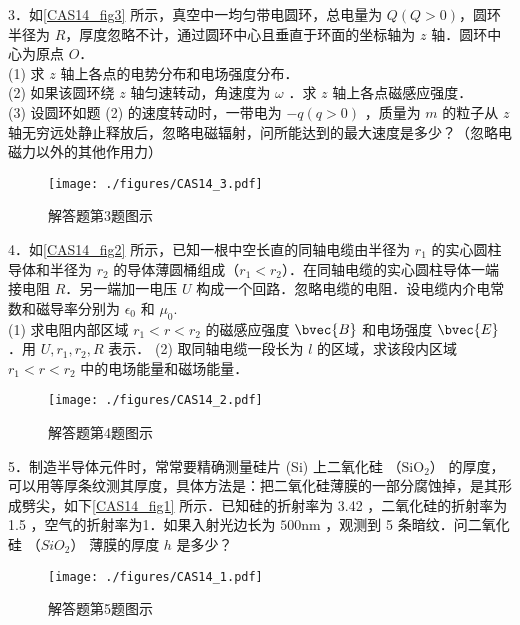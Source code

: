 3．如\autoref{CAS14_fig3} 所示，真空中一均匀带电圆环，总电量为 $Q(Q>0)$，圆环半径为 $R$，厚度忽略不计，通过圆环中心且垂直于环面的坐标轴为 $z$ 轴．圆环中心为原点 $O$．\\
(1) 求 $z$ 轴上各点的电势分布和电场强度分布．\\
(2) 如果该圆环绕 $z$ 轴匀速转动，角速度为 $\omega$ ．求 $z$ 轴上各点磁感应强度．\\
(3) 设圆环如题 (2) 的速度转动时，一带电为 $-q(q>0)$ ，质量为 $m$ 的粒子从 $z$ 轴无穷远处静止释放后，忽略电磁辐射，问所能达到的最大速度是多少？（忽略电磁力以外的其他作用力）
\begin{figure}[ht]
\centering
\texttt{[image: ./figures/CAS14\_3.pdf]}
\caption{解答题第3题图示} \label{CAS14_fig3}
\end{figure}

4．如\autoref{CAS14_fig2} 所示，已知一根中空长直的同轴电缆由半径为 $r_1$ 的实心圆柱导体和半径为 $r_2$ 的导体薄圆桶组成（$r_1<r_2$）．在同轴电缆的实心圆柱导体一端接电阻 $R$．另一端加一电压 $U$ 构成一个回路．忽略电缆的电阻．设电缆内介电常数和磁导率分别为 $\epsilon_0$ 和 $\mu_0$.\\
(1) 求电阻内部区域 $r_1<r<r_2$ 的磁感应强度 $\bvec{B}$ 和电场强度 $\bvec{E}$．用 $U,r_1,r_2,R$ 表示．
(2) 取同轴电缆一段长为 $l$ 的区域，求该段内区域 $r_1<r<r_2$ 中的电场能量和磁场能量．
\begin{figure}[ht]
\centering
\texttt{[image: ./figures/CAS14\_2.pdf]}
\caption{解答题第4题图示} \label{CAS14_fig2}
\end{figure}

5．制造半导体元件时，常常要精确测量硅片 (Si) 上二氧化硅 （$\mathrm{SiO_2}$） 的厚度，可以用等厚条纹测其厚度，具体方法是：把二氧化硅薄膜的一部分腐蚀掉，是其形成劈尖，如下\autoref{CAS14_fig1} 所示．已知硅的折射率为 3.42 ，二氧化硅的折射率为 1.5 ，空气的折射率为1．如果入射光边长为 $500\mathrm{nm}$ ，观测到 5 条暗纹．问二氧化硅 （$SiO_2$） 薄膜的厚度 $h$ 是多少？
\begin{figure}[ht]
\centering
\texttt{[image: ./figures/CAS14\_1.pdf]}
\caption{解答题第5题图示} \label{CAS14_fig1}
\end{figure}